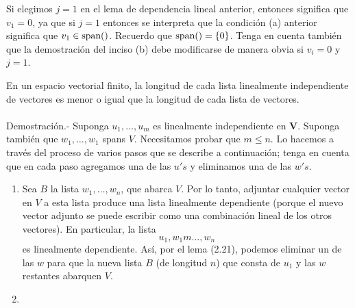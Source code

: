 Si elegimos $j=1$ en el lema de dependencia lineal anterior, entonces significa que $v_1=0$, ya que si $j=1$ entonces se interpreta que la condición (a) anterior significa que $v_1\in \mathop{\mbox{\normalfont span}}\nolimits()$. Recuerdo que $\mathop{\mbox{\normalfont span}}\nolimits()=\left\{0\right\}$. Tenga en cuenta también que la demostración del inciso (b) debe modificarse de manera obvia si $v_i=0$ y $j=1$.

\setcounter{myteo}{22}
\begin{myteo}
    En un espacio vectorial ﬁnito, la longitud de cada lista linealmente independiente de vectores es menor o igual que la longitud de cada lista de vectores.\\\\
    Demostración.-\; Suponga $u_1,\ldots,u_m$ es linealmente independiente en $\textbf{V}$. Suponga también que $w_1,\ldots,w_1$ spans $V$. Necesitamos probar que $m\leq n$. Lo hacemos a través del proceso de varios pasos que se describe a continuación; tenga en cuenta que en cada paso agregamos una de las $u's$ y eliminamos una de las $w's$.

    \begin{enumerate}
	\item Sea $B$ la lista $w_1,\ldots,w_n$, que abarca $V$. Por lo tanto, adjuntar cualquier vector en $V$ a esta lista produce una lista linealmente dependiente (porque el nuevo vector adjunto se puede escribir como una combinación lineal de los otros vectores). En particular, la lista
	$$u_1,w_1m\ldots,w_n$$
	es linealmente dependiente. Así, por el lema (2.21), podemos eliminar un de las $w$ para que la nueva lista $B$ (de longitud $n$) que consta de $u_1$ y las $w$ restantes abarquen $V$.
	\item 
    \end{enumerate}
\end{myteo}


\setcounter{mysection}{0}

